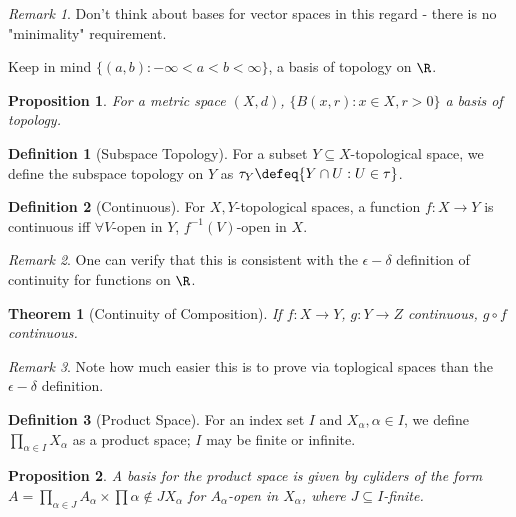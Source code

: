 \documentclass[12pt, oneside]{article}
\theoremstyle{definition}
\newtheorem{defn}{Definition}
\theoremstyle{plain}
\newtheorem{thm}{Theorem}
\newtheorem{prop}{Proposition}
\theoremstyle{remark}
\newtheorem{remark}{Remark}
\begin{document}
\begin{remark}
  Don't think about bases for vector spaces in this regard - there is no "minimality" requirement.

  Keep in mind $\{(a, b) : -\infty < a < b < \infty\}$, a basis of topology on $\R$.
\end{remark}

\begin{prop}
  For a metric space $(X, d)$, $\{B(x, r) : x \in X, r > 0\}$ a basis of topology.
\end{prop}

\begin{defn}[Subspace Topology]
  For a subset $Y \subseteq X$-topological space, we define the subspace topology on $Y$ as $\tau_Y \defeq \{Y \cap U : U \in \tau\}$.
\end{defn}

\begin{defn}[Continuous]
  For $X, Y$-topological spaces, a function $f : X \to Y$ is continuous iff $\forall V$-open in $Y$, $f^{-1}(V)$-open in $X$.
\end{defn}

\begin{remark}
  One can verify that this is consistent with the $\epsilon-\delta$ definition of continuity for functions on $\R$.
\end{remark}

\begin{thm}[Continuity of Composition]
  If $f : X \to Y$, $g : Y \to Z$ continuous, $g \circ f$ continuous.
\end{thm}
\begin{remark}
  Note how much easier this is to prove via toplogical spaces than the $\epsilon-\delta$ definition.
\end{remark}


\begin{defn}[Product Space]
  For an index set $I$ and $X_\alpha, \alpha \in I$, we define $\prod_{\alpha \in I} X_\alpha$ as a product space; $I$ may be finite or infinite.
\end{defn}

\begin{prop}
  A basis for the product space is given by cyliders of the form $A = \prod_{\alpha \in J} A_\alpha \times \prod{\alpha \notin J} X_\alpha$ for $A_\alpha$-open in $X_\alpha$, where $J \subseteq I$-finite.
\end{prop}
\end{document}
